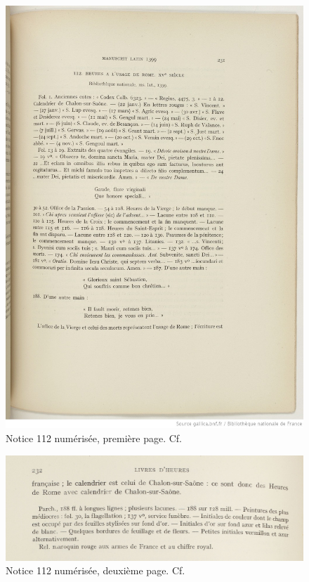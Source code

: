 \documentclass[a4paper,12pt,twoside]{book}
\begin{document}
    
    \begin{figure}[!h]
    \centering
    \includegraphics[width=15cm]{img/Notices_Leroquais/Notice112/Papier/notice_papier_112_1.jpeg}
    \caption{Notice 112 numérisée, première page. Cf. \cite[p. 231]{Leroquais_notices}}
    \end{figure}
    \clearpage
    
    \begin{figure}[!h]
    \centering
    \includegraphics[width=15cm]{img/Notices_Leroquais/Notice112/Papier/notice_papier-112_2.jpg}
    \caption{Notice 112 numérisée, deuxième page. Cf. \cite[p. 232]{Leroquais_notices}}
    \end{figure}
    \clearpage
    
\end{document}
